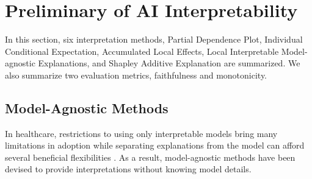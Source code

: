 

\newpage
\section{Preliminary of AI Interpretability}

In this section, six interpretation methods, Partial Dependence Plot, Individual Conditional Expectation, Accumulated Local Effects, Local Interpretable Model-agnostic Explanations, and Shapley Additive Explanation are summarized. We also summarize two evaluation metrics, faithfulness and monotonicity.

\subsection{\textbf{Model-Agnostic Methods}}

In healthcare, restrictions to using only interpretable models bring many limitations in adoption while separating explanations from the model can afford several beneficial flexibilities \cite{ribeiro2016modelagnostic}. As a result, model-agnostic methods have been devised to provide interpretations without knowing model details.



